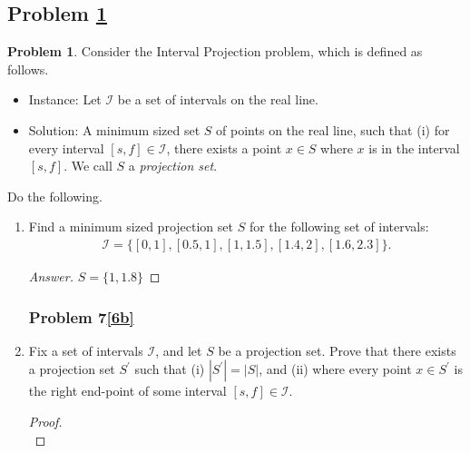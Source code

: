 \documentclass[11pt]{article}
\theoremstyle{definition}
\theoremstyle{definition}
\newtheorem{required}{Problem}
\theoremstyle{definition}
\begin{document}
\newpage
\subsection{Problem \ref{Exchange2}}

\begin{required} \label{Exchange2}
Consider the \textsf{Interval Projection} problem, which is defined as follows.
\begin{itemize}
\item \textsf{Instance:} Let $\mathcal{I}$ be a set of intervals on the real line.
\item \textsf{Solution:} A minimum sized set $S$ of points on the real line, such that (i) for every interval $[s, f] \in \mathcal{I}$, there exists a point $x \in S$ where $x$ is in the interval $[s, f]$. We call $S$ a \textit{projection set}.
\end{itemize}

\noindent Do the following.
\begin{enumerate}[label=(\alph*)]
\subsubsection{Problem 7\ref{6a}}
\item \label{6a} Find a minimum sized projection set $S$ for the following set of intervals:
\begin{align*}
\mathcal{I} = \{ [0, 1], [0.5, 1], [1, 1.5], [1.4, 2], [1.6, 2.3] \}.
\end{align*}


\begin{proof}[Answer]
$S = \{1,1.8\}$
\end{proof}

\newpage
\subsubsection{Problem 7\ref{6b}}
\item \label{6b} Fix a set of intervals $\mathcal{I}$, and let $S$ be a projection set. Prove that there exists a projection set $S^{\prime}$ such that (i) $|S^{\prime}| = |S|$, and (ii) where every point $x \in S^{\prime}$ is the right end-point of some interval $[s, f] \in \mathcal{I}$. 

\begin{proof} $ $ \\ 


\end{proof}
\end{enumerate}
\end{required}
\end{document}

